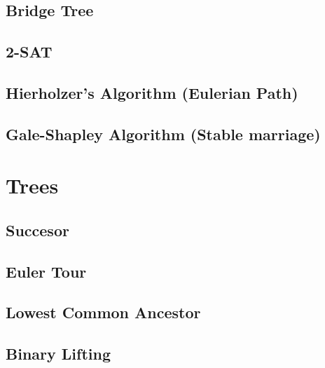 \documentclass[10pt]{article}
\begin{document}
\begin{multicols*}{2}
\subsection{Bridge Tree}



\subsection{2-SAT}


\subsection{Hierholzer's Algorithm (Eulerian Path)}


\subsection{Gale-Shapley Algorithm (Stable marriage)}


\section{Trees}

\subsection{Succesor}


\subsection{Euler Tour}


\subsection{Lowest Common Ancestor}


\subsection{Binary Lifting}



\end{multicols*}
\end{document}
